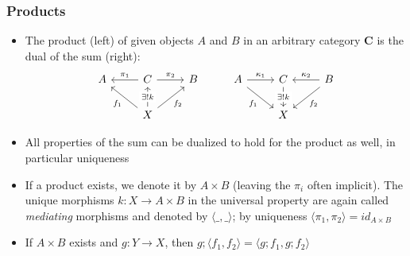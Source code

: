 \documentclass[handout]{beamer}
\newcommand{\bfsf}[1]{{\boldsymbol{#1}}}
\newcommand{\CC}{\bfsf{C}}
\begin{document}
\frame
  {   
    \frametitle{Products}\label{Ch4:Prod}

 \begin{itemize}[<+->]
\item The product (left) of given objects $A$ and $B$
in an arbitrary category $\CC$ is the dual of the sum (right):
\[
\begin{tikzcd}[ampersand replacement=\&]
A \&
C\arrow[swap]{l}{\pi_1} \arrow{r}{\pi_2}\&
B  \&
A \arrow{r}{\kappa_1} \arrow[swap]{dr}{f_1}\&
C\arrow{d}[description]{\exists!k} \& 
B \arrow[swap]{l}{\kappa_2}\arrow{dl}{f_2}
\\
\& X\arrow{ul}{f_1}\arrow{u}[description]{\exists!k} \arrow[swap]{ur}{f_2}\&\&
\& X 
\end{tikzcd}
\]
\item All properties of the sum can be dualized to hold for the product
as well, in particular uniqueness 
\item If a product exists, 
we denote it by $A\times B$ (leaving the $\pi_i$ often implicit).
The unique morphisms $k:  X\to A\times B$ in the universal property are again
called \emph{mediating} morphisms and denoted by $\langle\_,\_\rangle$;
by uniqueness $\langle\pi_1,\pi_2\rangle= id_{A\times B}$

\item If $A\times B$ exists and $g: Y\to X$,
then $g;\langle f_1,f_2\rangle = \langle g;f_1,g;f_2\rangle$

 \end{itemize}

 }
\end{document}
